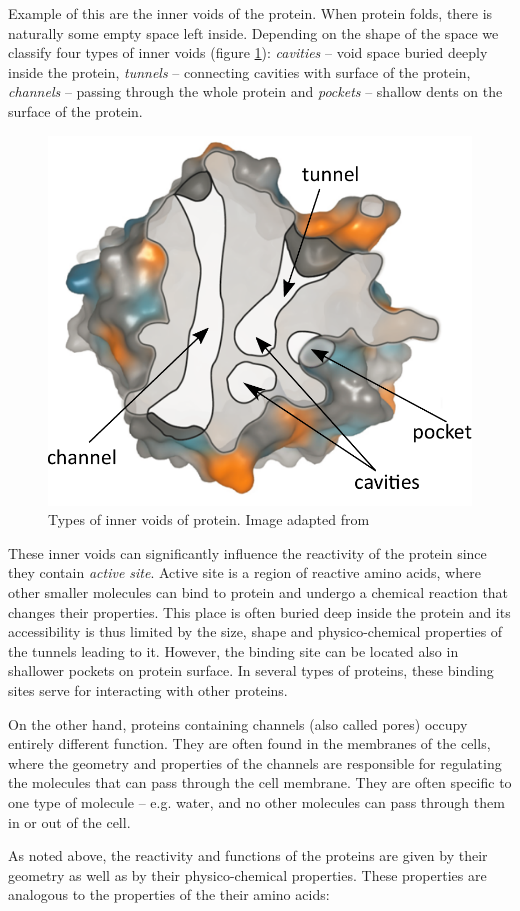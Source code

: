 Example of this are the inner voids of the protein. When protein folds, there is naturally some empty space left inside. Depending on the shape of the space we classify four types of inner voids (figure \ref{Fig:voids}): \textit{cavities} -- void space buried deeply inside the protein,  \textit{tunnels} -- connecting cavities with surface of the protein, \textit{channels} -- passing through the whole protein and \textit{pockets} -- shallow dents on the surface of the protein.

\begin{figure}[H]
  \centering
  \includegraphics[width=.5\textwidth]{pictures/Voids.pdf} 
  \caption{Types of inner voids of protein. Image adapted from \cite{Strnad2014Thesis}}
  \label{Fig:voids}
\end{figure}

These inner voids can significantly influence the reactivity of the protein since they contain \textit{active site}. Active site is a region of reactive amino acids, where other smaller molecules can bind to protein and undergo a chemical reaction that changes their properties. This place is often buried deep inside the protein and its accessibility is thus limited by the size, shape and physico-chemical properties of the tunnels leading to it. However, the binding site can be located also in shallower pockets on protein surface. In several types of proteins, these binding sites serve for interacting with other proteins.

On the other hand, proteins containing channels (also called pores) occupy entirely different function. They are often found in the membranes of the cells, where the geometry and properties of the channels are responsible for regulating the molecules that can pass through the cell membrane. They are often specific to one type of molecule -- e.g. water, and no other molecules can pass through them in or out of the cell.

As noted above, the reactivity and functions of the proteins are given by their geometry as well as by their physico-chemical properties. These properties are analogous to the properties of the their amino acids:

